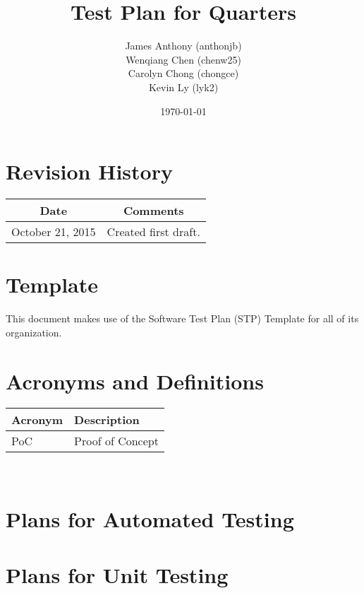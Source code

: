 \documentclass[12pt]{article}
\begin{document}
\title{Test Plan for Quarters} 
\author{James Anthony (anthonjb)\\ Wenqiang Chen (chenw25)\\ Carolyn Chong 
(chongce)\\ Kevin Ly (lyk2)}
\date{\today}
	
\maketitle

\pagebreak

\tableofcontents

\section*{Revision History}
\begin{tabular}{|c|c|}
\hline
\textbf{Date}  & \textbf{Comments} \\ \hline
October 21, 2015 & Created first draft. \\ 
\hline
\end{tabular}

\section*{Template}
This document makes use of the Software Test Plan (STP) Template for all of its organization.

\pagebreak


\section{Acronyms and Definitions}
\renewcommand{\arraystretch}{1.2}
\begin{tabular}{l l} 
  \toprule		
  \textbf{Acronym} & \textbf{Description}\\
  \midrule 
  PoC		&Proof of Concept\\
  \bottomrule
\end{tabular}\\


\section{Plans for Automated Testing}


\section{Plans for Unit Testing}
\end{document}
